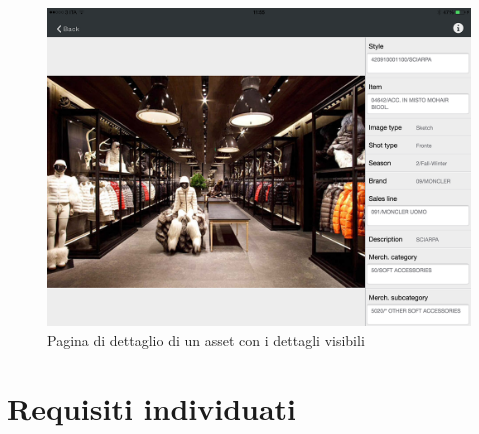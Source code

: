 \begin{figure}[htp]
\centering
\includegraphics[scale=0.25]{../immagini/warda-asset-dettaglio}
\caption{Pagina di dettaglio di un asset con i dettagli visibili}
\end{figure}
\FloatBarrier
%
%
%

\section{Requisiti individuati}

